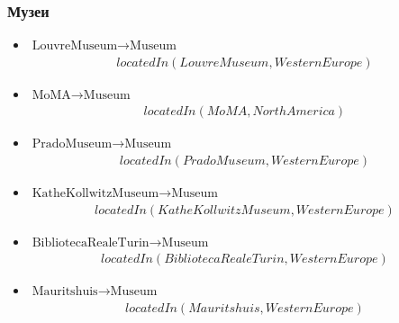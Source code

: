\documentclass{article}
\begin{document}
\subsubsection*{Музеи}
\begin{itemize}
  \item $\text{LouvreMuseum} \to \text{Museum}$
    \begin{align*}
      locatedIn(LouvreMuseum, WesternEurope)
    \end{align*}
  \item $\text{MoMA} \to \text{Museum}$
    \begin{align*}
      locatedIn(MoMA, NorthAmerica)
    \end{align*}
  \item $\text{PradoMuseum} \to \text{Museum}$
    \begin{align*}
      locatedIn(PradoMuseum, WesternEurope)
    \end{align*}
  \item $\text{KatheKollwitzMuseum} \to \text{Museum}$
    \begin{align*}
      locatedIn(KatheKollwitzMuseum, WesternEurope)
    \end{align*}
  \item $\text{BibliotecaRealeTurin} \to \text{Museum}$
    \begin{align*}
      locatedIn(BibliotecaRealeTurin, WesternEurope)
    \end{align*}
  \item $\text{Mauritshuis} \to \text{Museum}$
    \begin{align*}
      locatedIn(Mauritshuis, WesternEurope)
    \end{align*}
\end{itemize}
\end{document}
